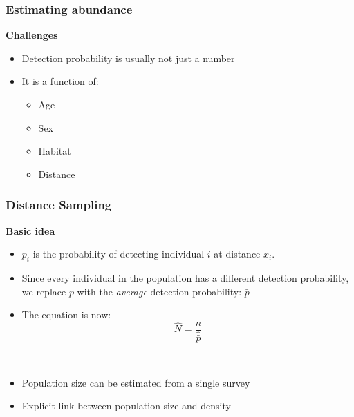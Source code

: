 \documentclass[color=usenames,dvipsnames]{beamer}\usepackage[]{graphicx}\usepackage[]{color}
\begin{document}
\begin{frame}
  \frametitle{Estimating abundance}
  \large
  {\bf Challenges}
  \begin{itemize}
    \item<1-> Detection probability is usually not just a number
    \item<2-> It is a function of: %
    \begin{itemize}
      \large
      \item Age
      \item Sex
      \item Habitat
      \item \alert{Distance}
    \end{itemize}
  \end{itemize}

\end{frame}







\begin{frame}
  \frametitle{Distance Sampling}
  \large
  {\bf Basic idea} \\
  \begin{itemize}
  \item<1-> $p_i$ is the probability of detecting individual $i$ at
    distance $x_i$.
  \item<2-> Since every individual in the population has a different
    detection probability, we replace $p$ with the {\it average}
    detection probability: $\bar{p}$
  \item<3-> The equation is now: \\
    \[
      \hat{N} = \frac{n}{\hat{\bar{p}}}
    \]
  \end{itemize}
  \vspace{0.1cm}
   \\
    \begin{itemize}
      \item<5-> Population size can be estimated from a single survey
      \item<6-> Explicit link between population size and density
    \end{itemize}
\end{frame}
\end{document}
